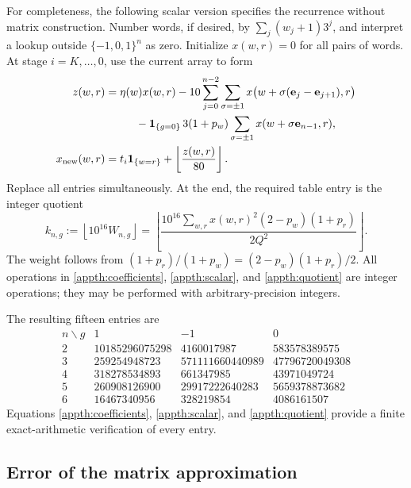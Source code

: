 For completeness, the following scalar version specifies the recurrence
without matrix construction. Number words, if desired, by
$\sum_j(w_j+1)3^j$, and interpret a lookup outside $\{-1,0,1\}^n$ as zero.
Initialize $x(w,r)=0$ for all pairs of words. At stage $i=K,\ldots,0$, use
the current array to form
\begin{align}
 z(w,r)={}&\eta(w)x(w,r)
       -10\sum_{j=0}^{n-2}\sum_{\sigma=\pm1}
             x\bigl(w+\sigma(\mathbf e_j-\mathbf e_{j+1}),r\bigr)
       \nonumber\\
 &\hspace{5mm}
       -\mathbf1_{\{g=0\}}\,3(1+p_w)
             \sum_{\sigma=\pm1}x(w+\sigma\mathbf e_{n-1},r),
       \label{appth:scalar}\\
 x_{\rm new}(w,r)={}&t_i\mathbf1_{\{w=r\}}
                    +\left\lfloor\frac{z(w,r)}{80}\right\rfloor.
       \nonumber
\end{align}
Replace all entries simultaneously. At the end, the required table entry is
the integer quotient
\begin{equation}\label{appth:quotient}
 k_{n,g}:=\left\lfloor10^{16}W_{n,g}\right\rfloor
 =\left\lfloor
 \frac{10^{16}\displaystyle\sum_{w,r}
                 x(w,r)^2(2-p_w)(1+p_r)}{2Q^2}
 \right\rfloor.
\end{equation}
The weight follows from
$(1+p_r)/(1+p_w)=(2-p_w)(1+p_r)/2$.
All operations in \eqref{appth:coefficients}, \eqref{appth:scalar}, and
\eqref{appth:quotient} are integer operations; they may be performed with
arbitrary-precision integers.

The resulting fifteen entries are
\begin{equation}\label{appth:integer-table}
\begin{array}{c|rrr}
 n\backslash g&1&-1&0\\\hline
 2&10185296075298&4160017987&583578389575\\
 3&259254948723&571111660440989&47796720049308\\
 4&318278534893&661347985&43971049724\\
 5&260908126900&29917222640283&5659378873682\\
 6&16467340956&328219854&4086161507
\end{array}
\end{equation}
Equations \eqref{appth:coefficients}, \eqref{appth:scalar}, and
\eqref{appth:quotient} provide a finite exact-arithmetic verification of
every entry.

\subsection{Error of the matrix approximation}

